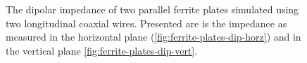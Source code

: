 \documentclass[review, number, sort&compress]{elsarticle}
\begin{document}
\begin{figure}
\caption{The dipolar impedance of two parallel ferrite plates simulated using two longitudinal coaxial wires. Presented are is the impedance as measured in the horizontal plane (\ref{fig:ferrite-plates-dip-horz}) and in the vertical plane \ref{fig:ferrite-plates-dip-vert}.}
\label{fig:ferrite-plates-dipolar}
\end{figure}
\end{document}
